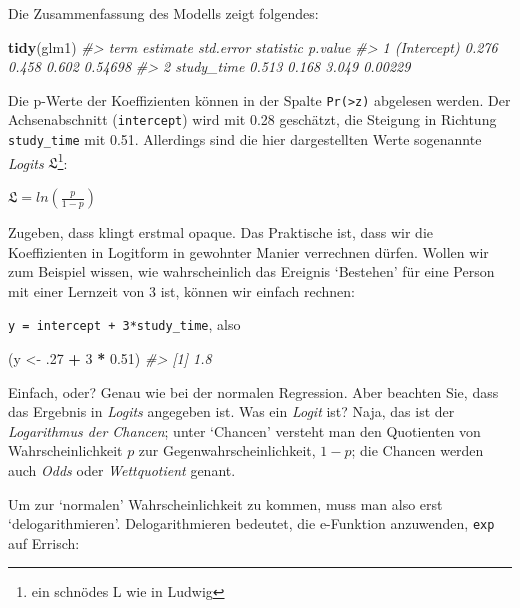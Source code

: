 \documentclass[12pt,ngerman,]{book}
\makeatletter
\newenvironment{Shaded}{\begin{snugshade}}{\end{snugshade}}
\newcommand{\KeywordTok}[1]{\textcolor[rgb]{0.13,0.29,0.53}{\textbf{#1}}}
\newcommand{\DecValTok}[1]{\textcolor[rgb]{0.00,0.00,0.81}{#1}}
\newcommand{\FloatTok}[1]{\textcolor[rgb]{0.00,0.00,0.81}{#1}}
\newcommand{\StringTok}[1]{\textcolor[rgb]{0.31,0.60,0.02}{#1}}
\newcommand{\CommentTok}[1]{\textcolor[rgb]{0.56,0.35,0.01}{\textit{#1}}}
\newcommand{\OperatorTok}[1]{\textcolor[rgb]{0.81,0.36,0.00}{\textbf{#1}}}
\newcommand{\NormalTok}[1]{#1}
\let\rmarkdownfootnote\footnote%
\def\footnote{\protect\rmarkdownfootnote}
\newenvironment{kframe}{%
\medskip{}
\setlength{\fboxsep}{.8em}
 \def\at@end@of@kframe{}%
 \ifinner\ifhmode%
  \def\at@end@of@kframe{\end{minipage}}%
  \begin{minipage}{\columnwidth}%
 \fi\fi%
 \def\FrameCommand##1{\hskip\@totalleftmargin \hskip-\fboxsep
 \colorbox{shadecolor}{##1}\hskip-\fboxsep
     \hskip-\linewidth \hskip-\@totalleftmargin \hskip\columnwidth}%
 \MakeFramed {\advance\hsize-\width
   \@totalleftmargin\z@ \linewidth\hsize
   \@setminipage}}%
 {\par\unskip\endMakeFramed%
 \at@end@of@kframe}
\renewenvironment{Shaded}{\begin{kframe}}{\end{kframe}}
\theoremstyle{definition}
\theoremstyle{definition}
\theoremstyle{remark}
\makeatother
\begin{document}
Die Zusammenfassung des Modells zeigt folgendes:

\begin{Shaded}
\begin{Highlighting}[]
\KeywordTok{tidy}\NormalTok{(glm1)}
\CommentTok{#>          term estimate std.error statistic p.value}
\CommentTok{#> 1 (Intercept)    0.276     0.458     0.602 0.54698}
\CommentTok{#> 2  study_time    0.513     0.168     3.049 0.00229}
\end{Highlighting}
\end{Shaded}

Die p-Werte der Koeffizienten können in der Spalte
\texttt{Pr(\textgreater{}\textbar{}z\textbar{})} abgelesen werden. Der
Achsenabschnitt (\texttt{intercept}) wird mit 0.28 geschätzt, die
Steigung in Richtung \texttt{study\_time} mit 0.51. Allerdings sind die
hier dargestellten Werte sogenannte \emph{Logits}
\(\mathfrak{L}\)\footnote{ein schnödes L wie in Ludwig}:

\(\mathfrak{L} = ln\left( \frac{p}{1-p} \right)\)

Zugeben, dass klingt erstmal opaque. Das Praktische ist, dass wir die
Koeffizienten in Logitform in gewohnter Manier verrechnen dürfen. Wollen
wir zum Beispiel wissen, wie wahrscheinlich das Ereignis `Bestehen' für
eine Person mit einer Lernzeit von 3 ist, können wir einfach rechnen:

\texttt{y\ =\ intercept\ +\ 3*study\_time}, also

\begin{Shaded}
\begin{Highlighting}[]
\NormalTok{(y <-}\StringTok{ }\NormalTok{.}\DecValTok{27} \OperatorTok{+}\StringTok{ }\DecValTok{3} \OperatorTok{*}\StringTok{ }\FloatTok{0.51}\NormalTok{)}
\CommentTok{#> [1] 1.8}
\end{Highlighting}
\end{Shaded}

Einfach, oder? Genau wie bei der normalen Regression. Aber beachten Sie,
dass das Ergebnis in \emph{Logits} angegeben ist. Was ein
\emph{Logit} ist? Naja, das ist der \emph{Logarithmus der Chancen};
unter `Chancen' versteht man den Quotienten von
Wahrscheinlichkeit \(p\) zur Gegenwahrscheinlichkeit, \(1-p\); die
Chancen werden auch \emph{Odds} oder \emph{Wettquotient}
genant.

Um zur `normalen' Wahrscheinlichkeit zu kommen, muss man also erst
`delogarithmieren'. Delogarithmieren bedeutet, die e-Funktion
anzuwenden, \texttt{exp} auf Errisch:
\end{document}
